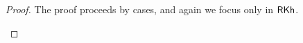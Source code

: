 \begin{proof} The proof proceeds by cases, and again we focus only in $\textsf{RKh}$.
	\begin{itemize}
	
	
	
	

\end{itemize}
\end{proof}
